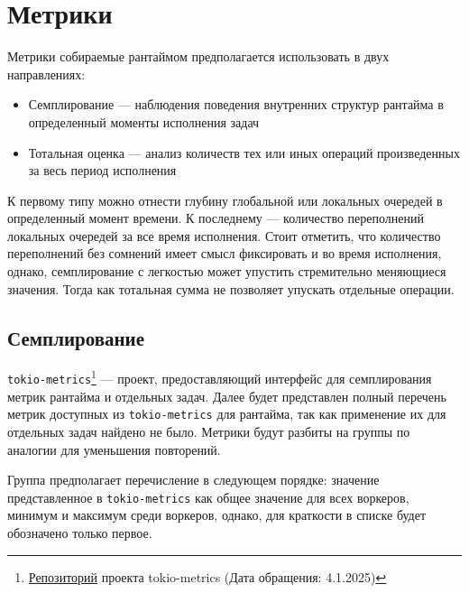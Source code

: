 
\section{Метрики}

Метрики собираемые рантаймом предполагается использовать в двух направлениях:

\begin{itemize}
    \item Семплирование --- наблюдения поведения внутренних структур рантайма в определенный моменты исполнения задач
    \item Тотальная оценка --- анализ количеств тех или иных операций произведенных за весь период исполнения
\end{itemize}

К первому типу можно отнести глубину глобальной или локальных очередей в определенный момент времени. К последнему --- количество переполнений локальных очередей за все время исполнения. Стоит отметить, что количество переполнений без сомнений имеет смысл фиксировать и во время исполнения, однако, семплирование с легкостью может упустить стремительно меняющиеся значения. Тогда как тотальная сумма не позволяет упускать отдельные операции.

\subsection{Семплирование}

\verb|tokio-metrics|\footnote{\href{https://github.com/tokio-rs/tokio-metrics}{Репозиторий} проекта tokio-metrics (Дата обращения: 4.1.2025)} --- проект, предоставляющий интерфейс для семплирования метрик рантайма и отдельных задач. Далее будет представлен полный перечень метрик доступных из \verb|tokio-metrics| для рантайма, так как применение их для отдельных задач найдено не было. Метрики будут разбиты на группы по аналогии для уменьшения повторений.

Группа предполагает перечисление в следующем порядке: значение представленное в \verb|tokio-metrics| как общее значение для всех воркеров, минимум и максимум среди воркеров, однако, для краткости в списке будет обозначено только первое.

